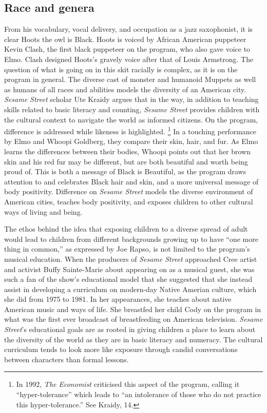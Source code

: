 \documentclass[12pt,letterpaper]{article}
\newcommand{\ses}{\textit{Sesame Street }}
\begin{document}
	\subsection*{Race and genera}

	From his vocabulary, vocal delivery, and occupation as a jazz 
	saxophonist, it is clear Hoots the owl is Black. Hoots is voiced by 
	African American puppeteer Kevin Clash, the first black puppeteer on the
	program, who also gave voice to Elmo. 
	Clash designed Hoots's gravely voice after that of Louis 
	Armstrong.\autocites()(Also see the biographical documentary of the same
	name.)[41]{Clash} The question of what is going on in this skit racially
	is complex, as it is on the program in general. The diverse cast of 
	monster and humanoid Muppets as well as humans of all races and 
	abilities models the diversity of an American city. \ses scholar Ute 
	Kraidy argues that in the way, in addition to teaching skills related
	to basic literacy and counting, \textit{Sesame Street} provides children
	with the cultural context to navigate the world as informed citizens.
	\autocite[13]{Kraidy} On the program, difference is addressed while
	likeness is highlighted\autocite[18]{Kraidy}. \footnote{In 
	1992, \textit{The Economist} criticised this aspect of the program, 
	calling it ``hyper-tolerance'' which leads to ``an intolerance of those
	who do not practice this hyper-tolerance.'' See Kraidy, 14.} In a
	touching performance by Elmo and Whoopi Goldberg, they
	compare their skin, hair, and fur. As Elmo learns the differences 
	between their bodies, Whoopi points out that her brown skin and his 
	red fur may be different, but are both beautiful and worth being proud 
	of.\autocite{2746} This is both a message of Black is Beautiful, as
	the program draws attention to and celebrates Black hair and skin, and 
	a more universal message of body positivity. Difference on \ses models
	the diverse environment of American cities, teaches body positivity, 
	and exposes children to other cultural ways of living and being.
	
	The ethos behind the idea that exposing children to a diverse spread 
	of adult would lead to children from different backgrounds growing up
	to have ``one more thing in common,'' as expressed by Joe Rapso, is not
	limited to the program's musical education. When the producers of 
	\ses approached Cree artist and activist Buffy Sainte-Marie about
	appearing on as a musical guest, she was such a fan of the show's 
	educational 
	model that she suggested that she instead assist in developing a 
	curriculum on modern-day Native Amerian culture, which she did from 
	1975 to 1981.\autocite[235]{Davis} In her appearances, she teaches 
	about native American music and ways of life. She breastfed her 
	child Cody on the program in what was the first ever broadcast of 
	breastfeeding on American television. \textit{Sesame Street}'s 
	educational goals are as rooted in giving children a place to learn
	about the diversity of the world as they are in basic literacy
	and numeracy. The cultural curriculum tends to look more like exposure
	through candid conversations between characters than formal
	lessons.  
\end{document}
